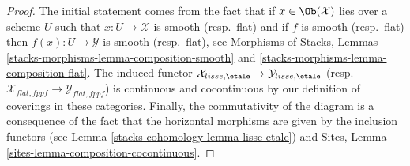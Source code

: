 \begin{proof}
The initial statement comes from the fact that if $x \in \Ob(\mathcal{X})$
lies over a scheme $U$ such that $x : U \to \mathcal{X}$ is smooth
(resp.\ flat) and if $f$ is smooth (resp.\ flat) then
$f(x) : U \to \mathcal{Y}$ is smooth (resp.\ flat), see
Morphisms of Stacks, Lemmas \ref{stacks-morphisms-lemma-composition-smooth} and
\ref{stacks-morphisms-lemma-composition-flat}. The induced functor
$\mathcal{X}_{lisse,\etale} \to \mathcal{Y}_{lisse,\etale}$
(resp.\ $\mathcal{X}_{flat,fppf} \to \mathcal{Y}_{flat,fppf}$) is
continuous and cocontinuous by our definition of coverings in these
categories. Finally, the commutativity of the diagram is a consequence of the
fact that the horizontal morphisms are given by the inclusion functors (see
Lemma \ref{stacks-cohomology-lemma-lisse-etale}) and
Sites, Lemma \ref{sites-lemma-composition-cocontinuous}.


\end{proof}

